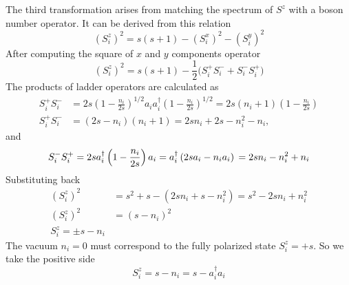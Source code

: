 \documentclass[../../../main.tex]{subfiles}
\begin{document}
The third transformation arises from matching the spectrum of $S^z$ with a boson number operator.
It can be derived from this relation
\begin{equation*}
    (S_i^z)^2 = s(s+1) - (S_i^x)^2 - (S_i^y)^2
\end{equation*}
After computing the square of $x$ and $y$ components operator
\begin{equation*}
    (S_i^z)^2 = s(s+1) - \frac{1}{2}\bigl(S_i^+ S_i^- + S_i^- S_i^+\bigr)
\end{equation*}
The products of ladder operators are calculated as
\begin{align*}
    S_i^+ S_i^-
     & =  2s\left(1-\frac{n_i}{2s}\right)^{1/2} a_i a_i^\dagger\left(1-\frac{n_i}{2s}\right)^{1/2} =  2s\left(n_i + 1\right)\left(1 - \frac{n_i}{2s}\right) \\
    S_i^+ S_i^-
     & =   \left(2s - n_i\right) (n_i+1) = 2 s n_i + 2 s - n_i^2 - n_i,
\end{align*}
and
\begin{equation*}
    S_i^- S_i^+
    =  2s  a_i^\dagger\left(1-\frac{n_i}{2s}\right) a_i
    =  a_i^\dagger\left(2s a_i - n_i a_i\right) \\
    =     2s n_i - n_i ^2 + n_i
\end{equation*}
Substituting back
\begin{align*}
    (S_i^z)^2
     & =  s^2 +s - (2s n_i + s - n_i ^2 ) = s^2 - 2s n_i + n_i^2 \\
    (S_i^z)^2
     & = (s - n_i)^2                                             \\
    S_i^z = \pm s - n_i
\end{align*}
The vacuum $n_i=0$ must correspond to the fully polarized state $S_i^z=+s$.
So we take the positive side
\begin{equation*}
    S_i^z = s - n_i = s - a_i ^\dagger a_i
\end{equation*}
\end{document}
